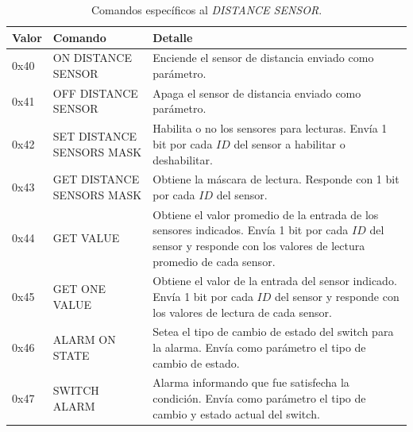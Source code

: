 \begin{table}[h]
	\begin{center}
		\begin{tabular}{|l|p{2.5cm}|p{7.5cm}|}
		\hline
		Valor & Comando & Detalle \\
		\hline
		0x40 & ON DISTANCE SENSOR & Enciende el sensor de distancia enviado como par\'ametro. \\
		\hline
		0x41 & OFF DISTANCE SENSOR & Apaga el sensor de distancia enviado como par\'ametro. \\
		\hline
		0x42 & SET DISTANCE SENSORS MASK & Habilita o no los sensores para lecturas.
		Env\'ia 1 bit por cada $ID$ del sensor a habilitar o deshabilitar.\\
		\hline
		0x43 & GET DISTANCE SENSORS MASK & Obtiene la m\'ascara de lectura.
		Responde con 1 bit por cada $ID$ del sensor.\\
		\hline
		0x44 & GET VALUE & Obtiene el valor promedio de la entrada de los sensores indicados.
		Env\'ia 1 bit por cada $ID$ del sensor y responde con los valores de lectura promedio de cada sensor. \\
		\hline
		0x45 & GET ONE VALUE &Obtiene el valor de la entrada del sensor indicado.
		Env\'ia 1 bit por cada $ID$ del sensor y responde con los valores de lectura de cada sensor. \\
		\hline
		0x46 & ALARM ON STATE & Setea el tipo de cambio de estado del switch para la alarma.
		Env\'ia como par\'ametro el tipo de cambio de estado.\\
		\hline
		0x47 & SWITCH ALARM & Alarma informando que fue satisfecha la condici\'on.
		Env\'ia como par\'ametro el tipo de cambio y estado actual del switch.\\
		\hline
		\end{tabular}
		\caption{Comandos espec\'ificos al \emph{DISTANCE SENSOR}. }
		\label{hT_comm_comandos_distance}
	\end{center}
\end{table}

